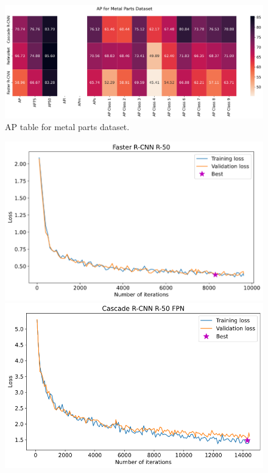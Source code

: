 \begin{figure}[h]
	\includegraphics[width=\linewidth]{Sources/Figures/metal/metal_ap.png}
	\caption{AP table for metal parts dataset.}
\end{figure}

\begin{figure}[htp]
	\centering
	\begin{minipage}{0.5\textwidth}
		\includegraphics[width=\textwidth]{Sources/Figures/metal/metal_frcnn_loss.png}
	\end{minipage}\hfill
	\begin{minipage}{0.5\textwidth}
		\includegraphics[width=\textwidth]{Sources/Figures/metal/metal_cascade_loss.png}

\end{minipage}
\end{figure}
